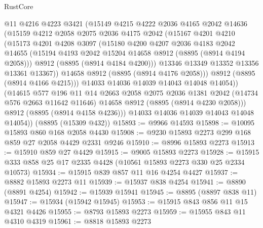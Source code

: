 \begin{lexlean}{RustCore}
\begin{coremodule}
              @11
              @4216
              @4223
              @3421
              (@15149
                @4215
                @4222
                @2036
                @4165
                @2042
                @14636
                (@15159
                  @4212
                  @2058
                  @2075
                  @2036
                  @4175
                  @2042
                  (@15167
                    @4201
                    @4210
                    (@15173
                      @4201
                      @4208
                      @3097
                      (@15180
                        @4200
                        @4207
                        @2036
                        @4183
                        @2042
                        @14655
                        (@15194 @4193 @2042 @15204 @14658 @8912 (@8895 (@8914 @4194 @2058)))
                        @8912
                        (@8895 (@8914 @4184 @4200)))
                      @13346
                      @13349
                      @13352
                      @13356
                      @13361
                      @13367))
                  @14658
                  @8912
                  (@8895 (@8914 @4176 @2058)))
                @8912
                (@8895 (@8914 @4166 @4215)))
              @14033
              @14036
              @14039
              @14043
              @14048
              @14054))
          (@14615
            @577
            @196
            @11
            @14
            @2663
            @2058
            @2075
            @2036
            @1381
            @2042
            (@14734 @576 @2663 @11642 @11646)
            @14658
            @8912
            (@8895 (@8914 @4230 @2058)))
          @8912
          (@8895 (@8914 @4158 @4236)))
        @14033
        @14036
        @14039
        @14043
        @14048
        @14054))
    (@8895 (@15309 @432))
@15893 := @9966 @14593
@15898 := @10095 @15893 @860 @168 @2058 @4430
@15908 := @9230 @15893 @2273 @299 @168 @859 @27 @2058 @4429 @2331 @9246
@15910 := @8996 @15893 @2273
@15913 := @15910 @859 @27 @4429
@15915 := @9005 @15893 @2273
@15928 := @15915 @333 @858 @25 @17 @2335 @4428 (@10561 @15893 @2273 @330 @25 @2334 @10573)
@15934 := @15915 @839 @857 @11 @16 @4254 @4427
@15937 := @8882 @15893 @2273 @11
@15939 := @15937 @838 @4254
@15941 := @8890 (@8891 @4254)
@15942 := @15939 @15941
@15945 := @8895 (@8897 @838 @11)
@15947 := @15934 (@15942 @15945)
@15953 := @15915 @843 @856 @11 @15 @4321 @4426
@15955 := @8793 @15893 @2273
@15959 := @15955 @843 @11 @4310 @4319
@15961 := @8818 @15893 @2273

\end{coremodule}
\end{lexlean}
